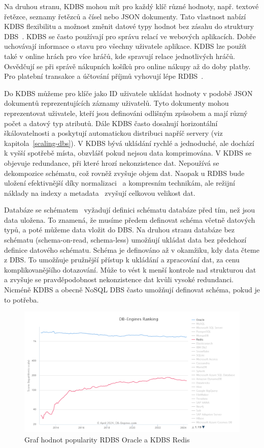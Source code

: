 \documentclass[czech,master,dept460,male,csharp,cpdeclaration]{diploma}
\begin{document}
	Na druhou stranu, KDBS mohou mít pro každý klíč různé hodnoty, např. textové řetězce, seznamy řetězců a čísel nebo JSON dokumenty. Tato vlastnost nabízí KDBS flexibilitu a možnost změnit datové typy hodnot bez zásahu do struktury DBS~\cite{schemaless-vs-schema-2}. KDBS se často používají pro správu relací ve webových aplikacích. Dobře uchovávají informace o stavu pro všechny uživatele aplikace. KDBS lze použít také v online hrách pro více hráčů, kde spravují relace jednotlivých hráčů. Osvědčují se při správě nákupních košíků pro online nákupy až do doby platby. Pro platební transakce a účtování příjmů vyhovují lépe RDBS~\cite{kdbs-memory}.
	
	Do KDBS můžeme pro klíče jako ID uživatele ukládat hodnoty v podobě JSON dokumentů reprezentujících záznamy uživatelů. Tyto dokumenty mohou reprezentovat uživatele, kteří jsou definováni odlišným způsobem a mají různý počet a datový typ atributů. Dále KDBS často dosahují horizontální škálovatelnosti a poskytují automatickou distribuci napříč servery (viz kapitola~\ref{scaling-dbs}). V KDBS bývá ukládání rychlé a jednoduché, ale dochází k vyšší spotřebě místa, obzvlášť pokud nejsou data komprimována. V KDBS se objevuje redundance, při které hrozí nekonzistence dat. Nepoužívá se dekompozice schématu, což rovněž zvyšuje objem dat. Naopak u RDBS bude uložení efektivnější díky normalizaci~\cite{normalizace} a kompresním technikám, ale režijní náklady na indexy a metadata~\cite{metadata} zvyšují celkovou velikost dat.
	
	Databáze se schématem~\cite{schemaless-vs-schema} vyžadují definici schématu databáze před tím, než jsou data uložena. To znamená, že musíme předem definovat schéma včetně datových typů, a poté můžeme data vložit do DBS. Na druhou stranu databáze bez schématu (schema-on-read, schema-less) umožňují ukládat data bez předchozí definice datového schématu. Schéma je definováno až v okamžiku, kdy data čteme z DBS. To umožňuje pružnější přístup k ukládání a zpracování dat, za cenu komplikovanějšího dotazování. Může to vést k menší kontrole nad strukturou dat a zvyšuje se pravděpodobnost nekonzistence dat kvůli vysoké redundanci. Nicméně KDBS a obecně NoSQL DBS často umožňují definovat schéma, pokud je to potřeba.
	
	\begin{figure}
		\centering
		\includegraphics[scale=0.65]{Data/db-engine-trend-dbs.PNG}
		\caption{Graf hodnot popularity RDBS Oracle a KDBS Redis~\cite{dbranking-trend-by-dbs}\label{graf-dbranking-trend-dbs}}
	\end{figure}
	
\end{document}
